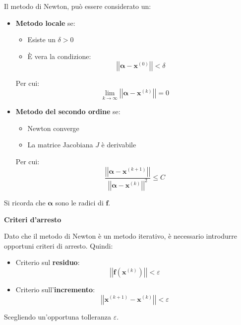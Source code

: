 \highspace
Il metodo di Newton, può essere considerato un:
\begin{itemize}
	\item \textbf{Metodo locale} se:
	\begin{itemize}
		\item Esiste un $\delta > 0$
		
		\item È vera la condizione:
		\begin{equation*}
			\left|\left|\mathbf{\alpha} - \mathbf{x}^{\left(0\right)}\right|\right| < \delta
		\end{equation*}
	\end{itemize}
	Per cui:
	\begin{equation*}
		\lim\limits_{k \rightarrow \infty} \left|\left|\mathbf{\alpha} - \mathbf{x}^{\left(k\right)}\right|\right| = 0
	\end{equation*}
	
	\item \textbf{Metodo del secondo ordine} se:
	\begin{itemize}
		\item Newton converge
		
		\item La matrice Jacobiana $J$ è derivabile
	\end{itemize}
	Per cui:
	\begin{equation*}
		\dfrac{
			\left|\left|\mathbf{\alpha} - \mathbf{x}^{\left(k+1\right)}\right|\right|
		}{
			\left|\left|\mathbf{\alpha} - \mathbf{x}^{\left(k\right)}\right|\right|^{2}
		} \le C
	\end{equation*}
\end{itemize}
Si ricorda che $\mathbf{\alpha}$ sono le radici di $\mathbf{f}$.

\highspace
\begin{flushleft}
	\textcolor{Green3}{ \textbf{Criteri d'arresto}}
\end{flushleft}
Dato che il metodo di Newton è un metodo iterativo, è necessario introdurre opportuni criteri di arresto. Quindi:
\begin{itemize}
	\item Criterio sul \textbf{residuo}:
	\begin{equation}
		\left|\left|\mathbf{f}\left(\mathbf{x}^{\left(k\right)}\right)\right|\right| < \varepsilon
	\end{equation}
	
	\item Criterio sull'\textbf{incremento}:
	\begin{equation}
		\left|\left|\mathbf{x}^{\left(k+1\right)} - \mathbf{x}^{\left(k\right)}\right|\right| < \varepsilon
	\end{equation}
\end{itemize}
Scegliendo un'opportuna tolleranza $\varepsilon$.

